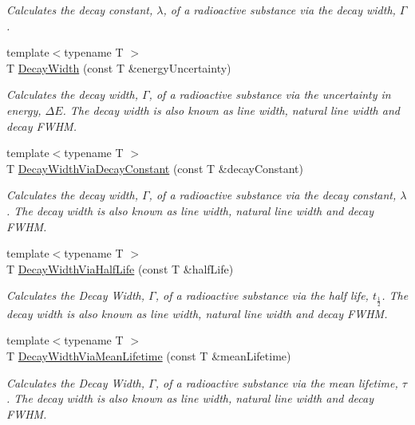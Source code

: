 \begin{DoxyCompactItemize}
\begin{DoxyCompactList}\small\item\em Calculates the decay constant, $\lambda$, of a radioactive substance via the decay width, $\Gamma$. \end{DoxyCompactList}\item 
{\footnotesize template$<$typename T $>$ }\\T \mbox{\hyperlink{group___e_g_x_phys-_decay_width_gae232ec8bb39710131be898c057a25620}{Decay\+Width}} (const T \&energy\+Uncertainty)
\begin{DoxyCompactList}\small\item\em Calculates the decay width, $\Gamma$, of a radioactive substance via the uncertainty in energy, $\Delta E$. The decay width is also known as line width, natural line width and decay F\+W\+HM. \end{DoxyCompactList}\item 
{\footnotesize template$<$typename T $>$ }\\T \mbox{\hyperlink{group___e_g_x_phys-_decay_width_ga143a666966efecc535a59bb4f36a79c6}{Decay\+Width\+Via\+Decay\+Constant}} (const T \&decay\+Constant)
\begin{DoxyCompactList}\small\item\em Calculates the decay width, $\Gamma$, of a radioactive substance via the decay constant, $\lambda$. The decay width is also known as line width, natural line width and decay F\+W\+HM. \end{DoxyCompactList}\item 
{\footnotesize template$<$typename T $>$ }\\T \mbox{\hyperlink{group___e_g_x_phys-_decay_width_ga1113224b24790a2e34032f9e90ad55c6}{Decay\+Width\+Via\+Half\+Life}} (const T \&half\+Life)
\begin{DoxyCompactList}\small\item\em Calculates the Decay Width, $\Gamma$, of a radioactive substance via the half life, $t_{\frac{1}{2}}$. The decay width is also known as line width, natural line width and decay F\+W\+HM. \end{DoxyCompactList}\item 
{\footnotesize template$<$typename T $>$ }\\T \mbox{\hyperlink{group___e_g_x_phys-_decay_width_ga0b65d991f3f3d72cf09a4a7b343a01ca}{Decay\+Width\+Via\+Mean\+Lifetime}} (const T \&mean\+Lifetime)
\begin{DoxyCompactList}\small\item\em Calculates the Decay Width, $\Gamma$, of a radioactive substance via the mean lifetime, $\tau$. The decay width is also known as line width, natural line width and decay F\+W\+HM. \end{DoxyCompactList}\item 

\end{DoxyCompactItemize}
